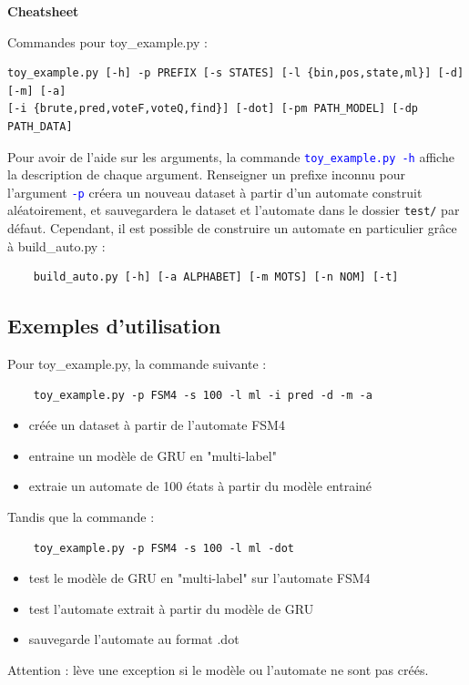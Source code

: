 \documentclass{article}
\newcommand{\cmd}[1]{\texttt{\textcolor{blue}{#1}}}
\begin{document}
\centerline{\Large\textbf{Cheatsheet}}

\vspace{1cm}

\noindent Commandes pour toy\_example.py : \\
\begin{verbatim}
toy_example.py [-h] -p PREFIX [-s STATES] [-l {bin,pos,state,ml}] [-d] [-m] [-a]
[-i {brute,pred,voteF,voteQ,find}] [-dot] [-pm PATH_MODEL] [-dp PATH_DATA]    
\end{verbatim}
Pour avoir de l'aide sur les arguments, la commande \cmd{toy\_example.py -h} affiche la description de chaque argument.
Renseigner un prefixe inconnu pour l'argument \cmd{-p} créera un nouveau dataset à partir d'un automate construit 
aléatoirement, et sauvegardera le dataset et l'automate dans le dossier \texttt{test/} par défaut.
Cependant, il est possible de construire un automate en particulier grâce à build\_auto.py :
\begin{verbatim}
    build_auto.py [-h] [-a ALPHABET] [-m MOTS] [-n NOM] [-t]
\end{verbatim}

\subsection*{Exemples d'utilisation}

Pour toy\_example.py, la commande suivante :
{\color{blue}
\begin{verbatim}
    toy_example.py -p FSM4 -s 100 -l ml -i pred -d -m -a
\end{verbatim}}
\begin{itemize}
    \item créée un dataset à partir de l'automate FSM4
    \item entraine un modèle de GRU en "multi-label"
    \item extraie un automate de 100 états à partir du modèle entrainé
\end{itemize}
Tandis que la commande :
{\color{blue}
\begin{verbatim}
    toy_example.py -p FSM4 -s 100 -l ml -dot
\end{verbatim}}
\begin{itemize}
    \item test le modèle de GRU en "multi-label" sur l'automate FSM4
    \item test l'automate extrait à partir du modèle de GRU
    \item sauvegarde l'automate au format .dot
\end{itemize}
{\color{red}Attention :} lève une exception si le modèle ou l'automate ne sont pas créés.
\end{document}
